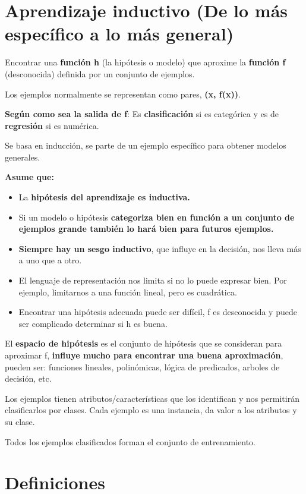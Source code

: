 \documentclass[12pt]{report} %
\begin{document}
\section{Aprendizaje inductivo (De lo más específico a lo más general)}

Encontrar una \textbf{función h} (la hipótesis o modelo) que aproxime la
\textbf{función f} (desconocida) definida por un conjunto de ejemplos.

Los ejemplos normalmente se representan como pares, \textbf{(x, f(x))}.

\textbf{Según como sea la salida de f}: Es \textbf{clasificación} si es
categórica y es de \textbf{regresión} si es numérica.

Se basa en inducción, se parte de un ejemplo específico para obtener
modelos generales.

\textbf{Asume que:}

\begin{itemize}
\item
  La \textbf{hipótesis del aprendizaje es inductiva.}
\item
  Si un modelo o hipótesis \textbf{categoriza bien en función a un
  conjunto de ejemplos grande también lo hará bien para futuros
  ejemplos.}
\item
  \textbf{Siempre hay un sesgo inductivo}, que influye en la decisión,
  nos lleva más a uno que a otro.
\item
  El lenguaje de representación nos limita si no lo puede expresar bien.
  Por ejemplo, limitarnos a una función lineal, pero es cuadrática.
\item
  Encontrar una hipótesis adecuada puede ser difícil, f es desconocida y
  puede ser complicado determinar si h es buena.
\end{itemize}

El \textbf{espacio de hipótesis} es el conjunto de hipótesis que se
consideran para aproximar f, \textbf{influye mucho para encontrar una
buena aproximación}, pueden ser: funciones lineales, polinómicas, lógica
de predicados, arboles de decisión, etc.

Los ejemplos tienen atributos/características que los identifican y nos
permitirán clasificarlos por clases. Cada ejemplo es una instancia, da
valor a los atributos y su clase.

Todos los ejemplos clasificados forman el conjunto de entrenamiento.

\section{Definiciones}
\end{document}
